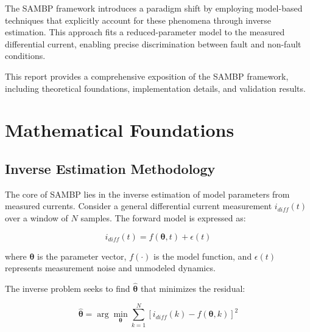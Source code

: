 \documentclass[12pt,a4paper]{article}
\begin{document}
The SAMBP framework introduces a paradigm shift by employing model-based techniques that explicitly account for these phenomena through inverse estimation. This approach fits a reduced-parameter model to the measured differential current, enabling precise discrimination between fault and non-fault conditions.

This report provides a comprehensive exposition of the SAMBP framework, including theoretical foundations, implementation details, and validation results.

\section{Mathematical Foundations}
\label{sec:math}

% 

\subsection{Inverse Estimation Methodology}
\label{subsec:inverse}

The core of SAMBP lies in the inverse estimation of model parameters from measured currents. Consider a general differential current measurement $i_{diff}(t)$ over a window of $N$ samples. The forward model is expressed as:

\begin{equation}
i_{diff}(t) = f(\boldsymbol{\theta}, t) + \epsilon(t)
\label{eq:forward}
\end{equation}

where $\boldsymbol{\theta}$ is the parameter vector, $f(\cdot)$ is the model function, and $\epsilon(t)$ represents measurement noise and unmodeled dynamics.

The inverse problem seeks to find $\hat{\boldsymbol{\theta}}$ that minimizes the residual:

\begin{equation}
\hat{\boldsymbol{\theta}} = \arg\min_{\boldsymbol{\theta}} \sum_{k=1}^N \left[ i_{diff}(k) - f(\boldsymbol{\theta}, k) \right]^2
\label{eq:inverse}
\end{equation}
\end{document}
